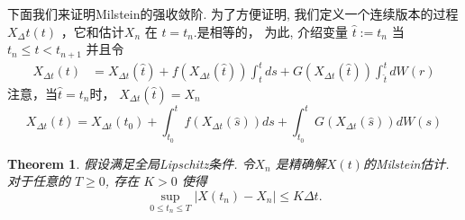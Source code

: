 \documentclass[12pt,final]{article}
\theoremstyle{plain}
\newtheorem{Theorem}{Theorem}[section]   %
\theoremstyle{Definition}
\theoremstyle{Remark}
\begin{document}
	
	下面我们来证明Milstein的强收敛阶. 为了方便证明, 我们定义一个连续版本的过程 $X_\Delta t(t)$ ，它和估计$X_n$ 在 $t=t_n.$是相等的， 为此, 介绍变量 $\hat{t}:=t_n$ 当$t_n\leq t<t_{n+1}$ 并且令
	$$\begin{aligned}
		X_{\Delta t}(t)&=X_{\Delta t}(\hat{t})+f(X_{\Delta t}(\hat{t}))\int_{\hat{t}}^{t}ds+G(X_{\Delta t}(\hat{t}))\int_{\hat{t}}^{t}dW(r)
	\end{aligned}$$
	注意，当$\hat{t}=t_n$时，	$X_{\Delta t}(\hat{t})=X_n$
	\begin{equation}\label{Milnum}
		X_{\Delta t}(t)=X_{\Delta t}(t_{0})+\int_{t_{0}}^{t}f(X_{\Delta t}(\hat{s}))ds+\int_{t_{0}}^{t}G(X_{\Delta t}(\hat{s}))dW(s)
	\end{equation}
	
	\begin{Theorem}
		假设满足全局Lipschitz条件.
		令$X_n$ 是精确解$X(t)$的Milstein估计. 对于任意的 $T\geq 0$, 存在 $K> 0$ 使得
		$$\sup\limits_{0\leq t_n\leq T}\left|X(t_n)-X_n\right|\leq K\Delta t.$$
	\end{Theorem}
\end{document}

